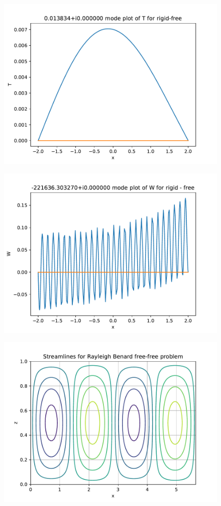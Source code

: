 \documentclass[12pt,a4paper,oneside]{article}
\begin{document}
   \newpage
        \begin{figure}[h!]
          \centering
          \includegraphics{./rigid-free_T_plot.pdf}
        \end{figure}

        \begin{figure}[h!]
          \centering
          \includegraphics{./rigid-free_W_plot.pdf}
        \end{figure}

   \newpage
        \begin{figure}[h!]
          \centering
          \includegraphics{./streamlines.pdf}
        \end{figure}

          \hspace{5mm}
\end{document}
